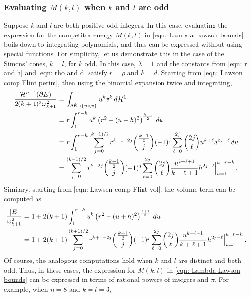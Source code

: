 \documentclass[10pt,reqno]{amsart}
\numberwithin{equation}{section}
\theoremstyle{definition}
\begin{document}
{{\subsubsection{Evaluating $M(k,l)$ when $k$ and $l$ are odd}\label{r:simplified-Lambda-Lawson}
Suppose $k$ and $l$ are both positive odd integers. 
In this case, evaluating the expression for the competitor energy $M(k,l)$ in \eqref{eqn: Lambda Lawson bounds} 
 boils down to integrating polynomials, and thus can be expressed without using special functions. For simplicity, let us demonstrate this in the case of the Simons' cones, $k=l$, for $k$ odd. In this case, $\lambda=1$ and the constants from \eqref{eqn: r and h} and  \eqref{eqn: rho and d} satisfy $r=\rho$ and $h=d$.
Starting from \eqref{eqn: Lawson comp Flint perim}, then using the binomial expansion twice and integrating,
\begin{align}\notag   
\frac{\mathcal{H}^{n-1}( \partial E)}{2(k+1)^2\omega_{k+1}^2}& =   \int_{\partial \hat{E} \cap \{ u<v\}} u^k v^k \, d \mathcal{H}^{1} \\ \notag 
&= r  \int_1^{r-h}u^k \left( r^2 - (u +h )^2\right)^{\frac{k-1}{2}}\,du \\ \notag
 &= r  \int_{1}^{r-h}\sum_{j=0}^{(k-1)/2}r^{k-1 - 2j}\binom{\frac{k-1}{2}}{j}(-1)^j\sum_{\ell=0}^{2j}\binom{2j}{\ell}u^{k+\ell}h^{2j - \ell}\, du\\ \notag
 &=  \sum_{j=0}^{(k-1)/2}r^{k- 2j}\binom{\frac{k-1}{2}}{j}(-1)^j\sum_{\ell=0}^{2j}\binom{2j}{\ell}\frac{u^{k+\ell+1}}{k+\ell+1}h^{2j - \ell} \Big|_{u=1}^{u=r-h}\,.
 \end{align}
Similary, starting from \eqref{eqn: Lawson comp Flint vol}, the volume term can be computed as
 \begin{align}\notag
\frac{|E|}{\omega_{k+1}^2} 
 &= 1 + 2(k+1) \int_1^{r-h} u^k \left( r^2  - (u +h )^2\right)^{\frac{k+1}{2}} \, du \\ \notag
 &= 1 + {2(k+1)}\sum_{j=0}^{(k+1)/2}r^{k+1 - 2j}\binom{\frac{k+1}{2}}{j}(-1)^j\sum_{\ell=0}^{2j}\binom{2j}{\ell}\frac{u^{k+\ell+1}}{k+\ell+1}h^{2j - \ell} \Big|_{u=1}^{u=r-h}\,.
\end{align}
Of course, the analogous computations hold when $k$ and $l$ are distinct and both odd. Thus, in these cases,
the expression for $M(k,l)$ in \eqref{eqn: Lambda Lawson bounds} can be expressed in terms of rational powers of integers and $\pi$. For example, when $n=8$ and $k=l=3$,
}}
\end{document}
